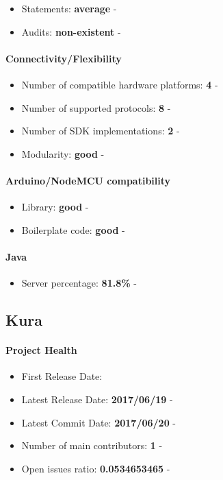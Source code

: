 \documentclass{article}
\begin{document}
\begin{itemize}
\item Statements: \textbf{average} - 
\item Audits: \textbf{non-existent} - 
\end{itemize}

\paragraph{Connectivity/Flexibility}

\begin{itemize}
\item Number of compatible hardware platforms: \textbf{4} - 
\item Number of supported protocols: \textbf{8} - 
\item Number of SDK implementations: \textbf{2} - 
\item Modularity: \textbf{good} - 
\end{itemize}

\paragraph{Arduino/NodeMCU compatibility}

\begin{itemize}
\item Library: \textbf{good} - 
\item Boilerplate code: \textbf{good} - 
\end{itemize}

\paragraph{Java} 

\begin{itemize}
\item Server percentage: \textbf{81.8\%} - 
\end{itemize}

\subsection{Kura}

\paragraph{Project Health}

\begin{itemize}
\item First Release Date: 
\item Latest Release Date: \textbf{2017/06/19} - 
\item Latest Commit Date: \textbf{2017/06/20} - 
\item Number of main contributors: \textbf{1} - 
\item Open issues ratio: \textbf{0.0534653465} - 
\end{itemize}
\end{document}
